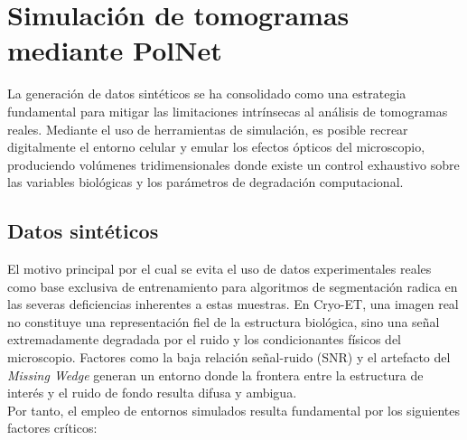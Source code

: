 \section{Simulación de tomogramas mediante PolNet}
La generación de datos sintéticos se ha consolidado como una estrategia fundamental para mitigar las limitaciones intrínsecas al análisis de tomogramas reales. Mediante el uso de herramientas de simulación, es posible recrear digitalmente el entorno celular y emular los efectos ópticos del microscopio, produciendo volúmenes tridimensionales donde existe un control exhaustivo sobre las variables biológicas y los parámetros de degradación computacional.

\subsection{Datos sintéticos}
El motivo principal por el cual se evita el uso de datos experimentales reales como base exclusiva de entrenamiento para algoritmos de segmentación radica en las severas deficiencias inherentes a estas muestras. En Cryo-ET, una imagen real no constituye una representación fiel de la estructura biológica, sino una señal extremadamente degradada por el ruido y los condicionantes físicos del microscopio. Factores como la baja relación señal-ruido (SNR) y el artefacto del \textit{Missing Wedge} generan un entorno donde la frontera entre la estructura de interés y el ruido de fondo resulta difusa y ambigua.\\

Por tanto, el empleo de entornos simulados resulta fundamental por los siguientes factores críticos:

